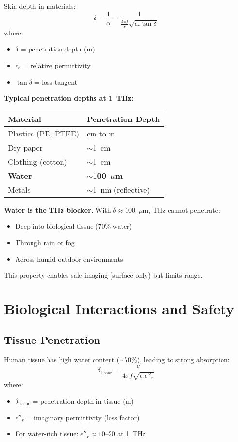 Skin depth in materials:
\begin{equation}
\delta = \frac{1}{\alpha} = \frac{1}{\frac{4\pi f}{c}\sqrt{\epsilon_r \tan\delta}}
\end{equation}
where:
\begin{itemize}
\item $\delta$ = penetration depth (m)
\item $\epsilon_r$ = relative permittivity
\item $\tan\delta$ = loss tangent
\end{itemize}

\textbf{Typical penetration depths at 1~THz:}

\begin{center}
\begin{tabular}{@{}ll@{}}
\toprule
Material & Penetration Depth \\
\midrule
Plastics (PE, PTFE) & cm to m \\
Dry paper & $\sim$1~cm \\
Clothing (cotton) & $\sim$1~cm \\
\textbf{Water} & \textbf{$\sim$100~$\mu$m} \\
Metals & $\sim$1~nm (reflective) \\
\bottomrule
\end{tabular}
\end{center}

\begin{keyconcept}
\textbf{Water is the THz blocker.} With $\delta \approx 100$~$\mu$m, THz cannot penetrate:
\begin{itemize}
\item Deep into biological tissue (70\% water)
\item Through rain or fog
\item Across humid outdoor environments
\end{itemize}
This property enables safe imaging (surface only) but limits range.
\end{keyconcept}

\section{Biological Interactions and Safety}

\subsection{Tissue Penetration}

Human tissue has high water content ($\sim$70\%), leading to strong absorption:
\begin{equation}
\delta_{\text{tissue}} = \frac{c}{4\pi f \sqrt{\epsilon_r \epsilon''_r}}
\end{equation}
where:
\begin{itemize}
\item $\delta_{\text{tissue}}$ = penetration depth in tissue (m)
\item $\epsilon''_r$ = imaginary permittivity (loss factor)
\item For water-rich tissue: $\epsilon''_r \approx 10$--20 at 1~THz
\end{itemize}

